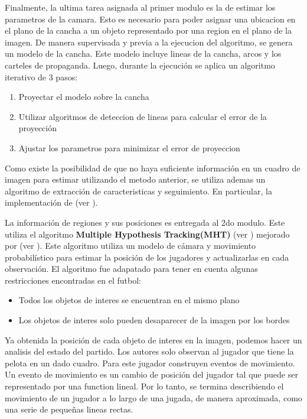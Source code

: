 \documentclass[a4paper,10pt]{article}
\begin{document}
Finalmente, la ultima tarea asignada al primer modulo es la de estimar los parametros de la camara.
Esto es necesario para poder asignar una ubicacion en el plano de la cancha a un objeto representado
por una region en el plano de la imagen.
De manera supervisada y previa a la ejecucion del algoritmo, se genera un modelo de la cancha.
Este modelo incluye lineas de la cancha, arcos y los carteles de propaganda.
Luego, durante la ejecución se aplica un algoritmo iterativo de 3 pasos:
\begin{enumerate}
\item Proyectar el modelo sobre la cancha
\item Utilizar algoritmos de deteccion de lineas para calcular el error de la proyección
\item Ajustar los parametros para minimizar el error de proyeccion
\end{enumerate}

Como existe la posibilidad de que no haya suficiente información en un cuadro de imagen para estimar
utilizando el metodo anterior, se utiliza ademas un algoritmo de extracción de caracteristicas y seguimiento.
En particular, la implementación de \citeauthor{shi-tomasi-tracking} (ver \cite{shi-tomasi-tracking}).

La información de regiones y sus posiciones es entregada al 2do modulo.
Este utiliza el algoritmo \textbf{Multiple Hypothesis Tracking(MHT)} (ver \cite{MHT-1, MHT-2}) mejorado por
\citeauthor*{Schmitt-1} (ver \cite{Schmitt-2}). Este algoritmo utiliza un modelo de cámara y movimiento
probabilístico para estimar la posición de los jugadores y actualizarlas en cada observación.
El algoritmo fue adapatado para tener en cuenta algunas restricciones encontradas en el futbol:
\begin{itemize}
\item Todos los objetos de interes se encuentran en el mismo plano
\item Los objetos de interes solo pueden desaparecer de la imagen por los bordes
\end{itemize}

Ya obtenida la posición de cada objeto de interes en la imagen, podemos hacer un analisis del estado del partido.
Los autores solo observan al jugador que tiene la pelota en un dado cuadro.
Para este jugador construyen eventos de movimiento. Un evento de movimiento es un cambio de posición del jugador
tal que puede ser representado por una function lineal. Por lo tanto, se termina describiendo el movimiento de un
jugador a lo largo de una jugada, de manera aproximada, como una serie de pequeñas lineas rectas.
\end{document}
